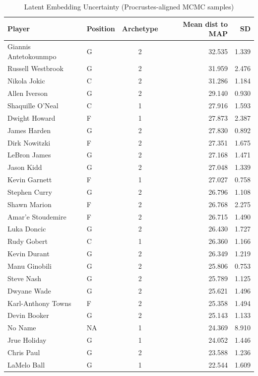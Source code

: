 \begin{table}[t]
\caption*{
{\fontsize{20}{25}\selectfont  Latent Embedding Uncertainty (Procrustes-aligned MCMC samples)\fontsize{12}{15}\selectfont }
} 
\fontsize{12.0pt}{14.0pt}\selectfont
\begin{tabular*}{\linewidth}{@{\extracolsep{\fill}}llcrr}
\toprule
Player & Position & Archetype & Mean dist to MAP & SD \\ 
\midrule\addlinespace[2.5pt]
Giannis Antetokounmpo & G & 2 & 32.535 & 1.339 \\ 
Russell Westbrook & G & 2 & 31.959 & 2.476 \\ 
Nikola Jokic & C & 2 & 31.286 & 1.184 \\ 
Allen Iverson & G & 2 & 29.140 & 0.930 \\ 
Shaquille O'Neal & C & 1 & 27.916 & 1.593 \\ 
Dwight Howard & F & 1 & 27.873 & 2.387 \\ 
James Harden & G & 2 & 27.830 & 0.892 \\ 
Dirk Nowitzki & F & 2 & 27.351 & 1.675 \\ 
LeBron James & G & 2 & 27.168 & 1.471 \\ 
Jason Kidd & G & 2 & 27.048 & 1.339 \\ 
Kevin Garnett & F & 1 & 27.027 & 0.758 \\ 
Stephen Curry & G & 2 & 26.796 & 1.108 \\ 
Shawn Marion & F & 2 & 26.768 & 2.275 \\ 
Amar'e Stoudemire & F & 2 & 26.715 & 1.490 \\ 
Luka Doncic & G & 2 & 26.430 & 1.727 \\ 
Rudy Gobert & C & 1 & 26.360 & 1.166 \\ 
Kevin Durant & G & 2 & 26.349 & 1.219 \\ 
Manu Ginobili & G & 2 & 25.806 & 0.753 \\ 
Steve Nash & G & 2 & 25.789 & 1.125 \\ 
Dwyane Wade & G & 2 & 25.621 & 1.496 \\ 
Karl-Anthony Towns & F & 2 & 25.358 & 1.494 \\ 
Devin Booker & G & 2 & 25.143 & 1.133 \\ 
No Name & NA & 1 & 24.369 & 8.910 \\ 
Jrue Holiday & G & 1 & 24.052 & 1.446 \\ 
Chris Paul & G & 2 & 23.588 & 1.236 \\ 
LaMelo Ball & G & 1 & 22.544 & 1.609 \\ 

\end{tabular*}
\end{table}
